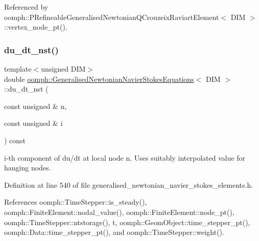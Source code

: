Referenced by oomph\+::\+P\+Refineable\+Generalised\+Newtonian\+Q\+Crouzeix\+Raviart\+Element$<$ D\+I\+M $>$\+::vertex\+\_\+node\+\_\+pt().

\mbox{\label{classoomph_1_1GeneralisedNewtonianNavierStokesEquations_a4633e47af05cc10a1125d711eeef1378}} 
\subsubsection{\texorpdfstring{du\+\_\+dt\+\_\+nst()}{du\_dt\_nst()}}
{\footnotesize\ttfamily template$<$unsigned D\+IM$>$ \\
double \hyperlink{classoomph_1_1GeneralisedNewtonianNavierStokesEquations}{oomph\+::\+Generalised\+Newtonian\+Navier\+Stokes\+Equations}$<$ D\+IM $>$\+::du\+\_\+dt\+\_\+nst (\begin{DoxyParamCaption}\item[{const unsigned \&}]{n,  }\item[{const unsigned \&}]{i }\end{DoxyParamCaption}) const\hspace{0.3cm}{\ttfamily [inline]}}



i-\/th component of du/dt at local node n. Uses suitably interpolated value for hanging nodes. 



Definition at line 540 of file generalised\+\_\+newtonian\+\_\+navier\+\_\+stokes\+\_\+elements.\+h.



References oomph\+::\+Time\+Stepper\+::is\+\_\+steady(), oomph\+::\+Finite\+Element\+::nodal\+\_\+value(), oomph\+::\+Finite\+Element\+::node\+\_\+pt(), oomph\+::\+Time\+Stepper\+::ntstorage(), t, oomph\+::\+Geom\+Object\+::time\+\_\+stepper\+\_\+pt(), oomph\+::\+Data\+::time\+\_\+stepper\+\_\+pt(), and oomph\+::\+Time\+Stepper\+::weight().

\mbox{\label{classoomph_1_1GeneralisedNewtonianNavierStokesEquations_a2eeb40971bc2f1018c9c75289807e737}} 
